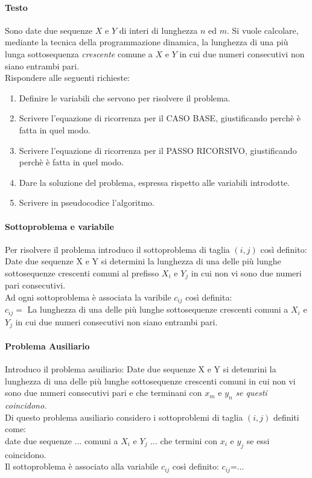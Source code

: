 \documentclass[12pt, a4paper, openany]{book}
\begin{document}
\paragraph{Testo}
Sono date due sequenze $X$ e $Y$ di interi di lunghezza $n$ ed $m$.
Si vuole calcolare, mediante la tecnica della programmazione dinamica, la lunghezza di una più lunga sottosequenza \emph{crescente} comune a $X$ e $Y$ in cui due numeri consecutivi non siano entrambi pari.
\\Rispondere alle seguenti richieste:
\begin{enumerate}
	\item Definire le variabili che servono per risolvere il problema.
	\item Scrivere l'equazione di ricorrenza per il CASO BASE, giustificando perchè è fatta in quel modo.
	\item Scrivere l'equazione di ricorrenza per il PASSO RICORSIVO, giustificando perchè è fatta in quel modo.
	\item Dare la soluzione del problema, espressa rispetto alle variabili introdotte.
	\item Scrivere in pseudocodice l'algoritmo.
\end{enumerate}

\paragraph*{Sottoproblema e variabile}
Per risolvere il problema introduco il sottoproblema di taglia $(i,j)$ così definito:
Date due sequenze X e Y si determini la lunghezza di una delle più lunghe sottosequenze crescenti comuni al prefisso $X_i$ e $Y_j$ in cui non vi sono due 
numeri pari consecutivi.
\\Ad ogni sottoproblema è associata la varibile $c_{ij}$ così definita:
\\$c_{ij}=$ La lunghezza di una delle più lunghe sottosequenze crescenti comuni a $X_i$ e $Y_j$ in cui due numeri consecutivi non siano entrambi pari.

\paragraph*{Problema Ausiliario}
Introduco il problema asuiliario:
Date due sequenze X e Y si detemrini la lunghezza di una delle più lunghe sottosequenze crescenti comuni in cui non vi sono due numeri consecutivi pari
e che terminani con $x_m$ e $y_n$ \emph{se questi coincidono}.
\\Di questo problema ausiliario considero i sottoproblemi di taglia $(i,j)$ definiti come:
\\date due sequenze ... comuni a $X_i$ e $Y_j$ ... che termini con $x_i$ e $y_j$ se essi coincidono.
\\Il sottoproblema è associato alla variabile $c_{ij}$ così definito:
$c_{ij}$=...
\end{document}
